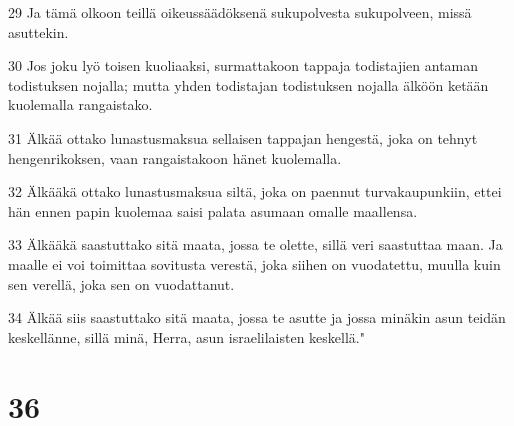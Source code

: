 \par 29 Ja tämä olkoon teillä oikeussäädöksenä sukupolvesta sukupolveen, missä asuttekin.
\par 30 Jos joku lyö toisen kuoliaaksi, surmattakoon tappaja todistajien antaman todistuksen nojalla; mutta yhden todistajan todistuksen nojalla älköön ketään kuolemalla rangaistako.
\par 31 Älkää ottako lunastusmaksua sellaisen tappajan hengestä, joka on tehnyt hengenrikoksen, vaan rangaistakoon hänet kuolemalla.
\par 32 Älkääkä ottako lunastusmaksua siltä, joka on paennut turvakaupunkiin, ettei hän ennen papin kuolemaa saisi palata asumaan omalle maallensa.
\par 33 Älkääkä saastuttako sitä maata, jossa te olette, sillä veri saastuttaa maan. Ja maalle ei voi toimittaa sovitusta verestä, joka siihen on vuodatettu, muulla kuin sen verellä, joka sen on vuodattanut.
\par 34 Älkää siis saastuttako sitä maata, jossa te asutte ja jossa minäkin asun teidän keskellänne, sillä minä, Herra, asun israelilaisten keskellä."

\chapter{36}

